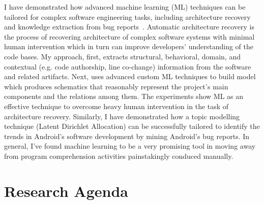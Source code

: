 \documentclass[a4paper]{article}
\begin{document}


I have demonstrated how advanced machine learning (ML) techniques can be tailored for complex software engineering tasks, including architecture recovery~\cite{archrecoveryicpc, archrecoveryisec} and knowledge extraction from bug reports~\cite{topicmodelling}. 
Automatic architecture recovery is the process of recovering architecture of complex software systems with minimal human intervention which in turn can
improve developers’ understanding of the code bases. My approach, first, extracts structural, behavioral, domain, and contextual (e.g. code
authorship, line co-change) information from the software and related artifacts. Next, uses advanced custom ML techniques to build model which produces schematics that reasonably represent the
project’s main components and the relations among them. 
The experiments show ML as an effective technique to overcome heavy human intervention in the task of architecture recovery.  Similarly, I have demonstrated how a topic modelling technique (Latent Dirichlet Allocation) can be successfully tailored to identify the trends in Android’s software development by mining Android’s bug reports. In general, I've found machine learning to be a very promising tool in moving away from program comprehension activities painstakingly conduced manually.

\section*{Research Agenda}
\end{document}
